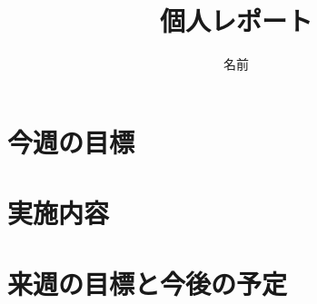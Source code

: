 \documentclass{jarticle}
\title{個人レポート}
\author{名前}
\begin{document}
\maketitle
\section{今週の目標}
\section{実施内容}
\section{来週の目標と今後の予定}
\end{document}
